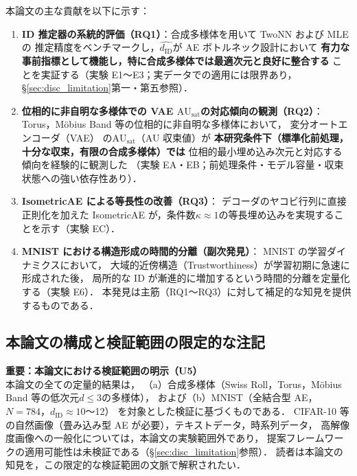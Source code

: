 \documentclass[12pt,a4paper]{jsarticle}
\newcommand{\dID}{d_{\mathrm{ID}}}
\newcommand{\kap}{\kappa}
\newcommand{\AUsat}{\mathrm{AU}_{\mathrm{sat}}}
\begin{document}
本論文の主な貢献を以下に示す：
\begin{enumerate}
  \item \textbf{ID 推定器の系統的評価（RQ1）}：合成多様体を用いて TwoNN および MLE の
        推定精度をベンチマークし，$\hat{\dID}$が AE ボトルネック設計において
        \textbf{有力な事前指標として機能し，特に合成多様体では最適次元と良好に整合する}
        ことを実証する（実験 E1〜E3；実データでの適用には限界あり，§\ref{sec:disc_limitation}第一・第五参照）．
  \item \textbf{位相的に非自明な多様体での VAE $\AUsat$の対応傾向の観測（RQ2）}：
        Torus，Möbius Band 等の位相的に非自明な多様体において，
        変分オートエンコーダ（VAE）\cite{kingma2014vae} の$\AUsat$（AU 収束値）が
        \textbf{本研究条件下（標準化前処理，十分な収束，有限の合成多様体）では}
        位相的最小埋め込み次元と対応する傾向を経験的に観測した
        （実験 EA・EB；前処理条件・モデル容量・収束状態への強い依存性あり）．
  \item \textbf{IsometricAE による等長性の改善（RQ3）}：
        デコーダのヤコビ行列に直接正則化を加えた IsometricAE\cite{kato2020rdae,nazari2023geometric}
        が，条件数$\kap \approx 1$の等長埋め込みを実現することを示す（実験 EC）．
  \item \textbf{MNIST における構造形成の時間的分離（副次発見）}：
        MNIST の学習ダイナミクスにおいて，
        大域的近傍構造（Trustworthiness）が学習初期に急速に形成された後，
        局所的な ID が漸進的に増加するという時間的分離を定量化する（実験 E6）．
        本発見は主筋（RQ1〜RQ3）に対して補足的な知見を提供するものである．
\end{enumerate}

\subsection{本論文の構成と検証範囲の限定的な注記}\label{sec:intro_structure}

\textbf{重要：本論文における検証範囲の明示（U5）}\\
本論文の全ての定量的結果は，
（a）合成多様体（Swiss Roll，Torus，Möbius Band 等の低次元$d \leq 3$の多様体），
および（b）MNIST（全結合型 AE，$N = 784$，$d_\mathrm{ID} \approx 10$〜12）
を対象とした検証に基づくものである．
CIFAR-10 等の自然画像（畳み込み型 AE が必要），テキストデータ，時系列データ，
高解像度画像への一般化については，本論文の実験範囲外であり，
提案フレームワークの適用可能性は未検証である（§\ref{sec:disc_limitation}参照）．
読者は本論文の知見を，この限定的な検証範囲の文脈で解釈されたい．
\end{document}
